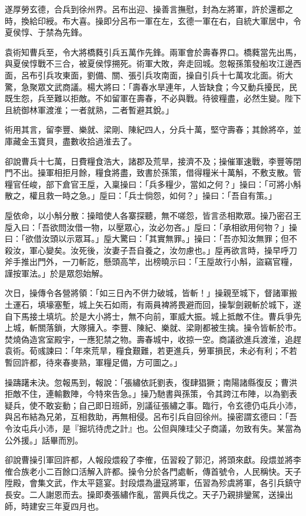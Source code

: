 遂厚勞玄德，合兵到徐州界。呂布出迎、操善言撫慰，封為左將軍，許於還都之時，換給印綬。布大喜。操即分呂布一軍在左，玄德一軍在右，自統大軍居中，令夏侯惇、于禁為先鋒。

袁術知曹兵至，令大將橋蕤引兵五萬作先鋒。兩軍會於壽春界口。橋蕤當先出馬，與夏侯惇戰不三合，被夏侯惇搠死。術軍大敗，奔走回城。忽報孫策發船攻江邊西面，呂布引兵攻東面，劉備、關、張引兵攻南面，操自引兵十七萬攻北面。術大驚，急聚眾文武商議。楊大將曰：「壽春水旱連年，人皆缺食；今又動兵擾民，民既生怨，兵至難以拒敵。不如留軍在壽春，不必與戰。待彼糧盡，必然生變。陛下且統御林軍渡淮；一者就熟，二者暫避其銳。」

術用其言，留李豐、樂就、梁剛、陳紀四人，分兵十萬，堅守壽春；其餘將卒，並庫藏金玉寶貝，盡數收拾過淮去了。

卻說曹兵十七萬，日費糧食浩大，諸郡及荒旱，接濟不及；操催軍速戰，李豐等閉門不出。操軍相拒月餘，糧食將盡，致書於孫策，借得糧米十萬斛，不敷支散。管糧官任峻，部下倉官王垕，入稟操曰：「兵多糧少，當如之何？」操曰：「可將小斛散之，權且救一時之急。」垕曰：「兵士倘怨，如何？」操曰：「吾自有策。」

垕依命，以小斛分散：操暗使人各寨探聽，無不嗟怨，皆言丞相欺眾。操乃密召王垕入曰：「吾欲問汝借一物，以壓眾心，汝必勿吝。」垕曰：「承相欲用何物？」操曰：「欲借汝頭以示眾耳。」垕大驚曰：「其實無罪。」操曰：「吾亦知汝無罪；但不殺汝，軍心變矣。汝死後，汝妻子吾自養之，汝勿慮也。」垕再欲言時，操早呼刀斧手推出門外，一刀斬訖，懸頭高竿，出榜曉示曰：「王垕故行小斛，盜竊官糧，謹按軍法。」於是眾怨始解。

次日，操傳令各營將領：「如三日內不併力破城，皆斬！」操親至城下，督諸軍搬土運石，填壕塞塹，城上矢石如雨，有兩員裨將畏避而回，操掣劍親斬於城下，遂自下馬接土填坑。於是大小將士，無不向前，軍威大振。城上抵敵不住。曹兵爭先上城，斬關落鎖，大隊擁入。李豐、陳紀、樂就、梁剛都被生擒。操令皆斬於市。焚燒偽造宮室殿宇，一應犯禁之物。壽春城中，收掠一空。商議欲進兵渡淮，追趕袁術。荀彧諫曰：「年來荒旱，糧食艱難，若更進兵，勞軍損民，未必有利；不若暫回許都，待來春麥熟，軍糧足備，方可圖之。」

操躊躇未決。忽報馬到，報說：「張繡依託劉表，復肆猖獗；南陽諸縣復反；曹洪拒敵不住，連輸數陣，今特來告急。」操乃馳書與孫策，令其跨江布陣，以為劉表疑兵，使不敢妄動；自己即日班師，別議征張繡之事。臨行，令玄德仍屯兵小沛，與呂布結為兄弟，互相救助，再無相侵。呂布引兵自回徐州。操密謂玄德曰：「吾令汝屯兵小沛，是『掘坑待虎之計』也。公但與陳珪父子商議，勿致有失。某當為公外援。」話畢而別。

卻說曹操引軍回許都，人報段煨殺了李傕，伍習殺了郭氾，將頭來獻。段煨並將李傕合族老小二百餘口活解入許都。操令分於各門處斬，傳首號令，人民稱快。天子陞殿，會集文武，作太平筵宴。封段煨為盪寇將軍，伍習為殄虞將軍，各引兵鎮守長安。二人謝恩而去。操即奏張繡作亂，當興兵伐之。天子乃親排鑾駕，送操出師，時建安三年夏四月也。

